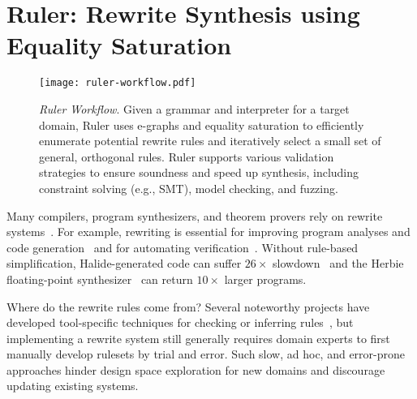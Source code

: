 \section{Ruler: Rewrite Synthesis using Equality Saturation}

\newcommand{\rationals}{{rationals}\xspace}
\newcommand{\bfour}{{bitvector-4}\xspace}
\newcommand{\bthreetwo}{{bitvector-32}\xspace}
\newcommand{\booleans}{{booleans}\xspace}
\newcommand{\ints}{ℤ}
\newcommand{\reals}{ℝ}
\newcommand{\ruler}{Ruler\xspace}
\newcommand{\Ruler}{Ruler\xspace}
\newcommand{\cvec}{cvec\xspace}
\newcommand{\cvecs}{cvecs\xspace}



\begin{figure}
  \texttt{[image: ruler-workflow.pdf]}
  \caption{
    \textit{\ruler Workflow}.
    Given a grammar and interpreter for a target domain,
    \ruler uses e-graphs and equality saturation
    to efficiently enumerate potential rewrite rules and
    iteratively select a small set of general, orthogonal rules.
    \ruler supports various validation strategies to
    ensure soundness and speed up synthesis, including
    constraint solving (e.g., SMT), model checking, and fuzzing.
  }\label{fig:ruler}
\end{figure}

Many compilers, program synthesizers, and theorem provers
  rely on rewrite systems~\cite{
    haskell, arvind-hw-synth-rw, simplify}.
For example, rewriting is essential for
  improving program analyses and code generation~\cite{
    isel-survey, mlir, halide, tvm}
  and for automating verification~\cite{
    cvc4, z3, isabelle, coq}.
Without rule-based simplification,
  Halide-generated code can
  suffer $26\times$ slowdown~\cite{julie-halide}
  and
  the Herbie floating-point synthesizer~\cite{herbie}
  can return $10\times$ larger programs.

Where do the rewrite rules come from?
Several noteworthy projects have developed
  tool-specific techniques for checking or inferring rules~\cite{
    bansal, alive-infer, denali, swapper},
  but %
  implementing a rewrite system
  still generally requires domain experts to
  first manually develop rulesets by trial and error.
Such slow, ad hoc, and error-prone approaches
  hinder design space exploration for new domains
  and discourage updating existing systems.


